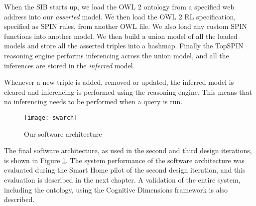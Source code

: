 When the \ac{SIB} starts up, we load the \ac{OWL} 2 ontology from a specified web address into our \emph{asserted} model. We then load the OWL 2 RL specification, specified as \ac{SPIN} rules, from another \ac{OWL} file. We also load any custom \ac{SPIN} functions into another model. We then build a union model of all the loaded models and store all the asserted triples into a hashmap. Finally the TopSPIN reasoning engine performs inferencing across the union model, and all the inferences are stored in the \emph{inferred} model.

Whenever a new triple is added, removed or updated, the inferred model is cleared and inferencing is performed using the reasoning engine. This means that no inferencing needs to be performed when a query is run. 

\begin{figure}
	\centering
	\centerline{\texttt{[image: swarch]}}
	\caption{Our software architecture}
	\label{swarch}
\end{figure}

The final software architecture, as used in the second and third design iterations, is shown in Figure \ref{swarch}. The system performance of the software architecture was evaluated during the Smart Home pilot of the second design iteration, and this evaluation is described in the next chapter. A validation of the entire system, including the ontology, using the Cognitive Dimensions framework is also described.







